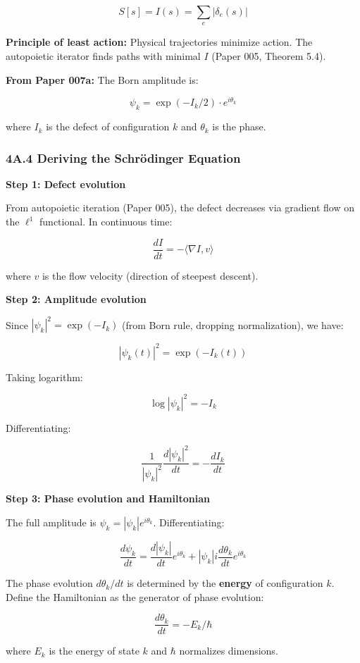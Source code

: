 \documentclass[
]{article}
\begin{document}
\[S[s] = I(s) = \sum_e |\delta_e(s)|\]

\textbf{Principle of least action:} Physical trajectories minimize
action. The autopoietic iterator finds paths with minimal \(I\) (Paper
005, Theorem 5.4).

\textbf{From Paper 007a:} The Born amplitude is:

\[\psi_k = \exp(-I_k/2) \cdot e^{i\theta_k}\]

where \(I_k\) is the defect of configuration \(k\) and \(\theta_k\) is
the phase.

\subsubsection{4A.4 Deriving the Schrödinger
Equation}\label{a.4-deriving-the-schruxf6dinger-equation}

\textbf{Step 1: Defect evolution}

From autopoietic iteration (Paper 005), the defect decreases via
gradient flow on the \(\ell^1\) functional. In continuous time:

\[\frac{dI}{dt} = -\langle \nabla I, v \rangle\]

where \(v\) is the flow velocity (direction of steepest descent).

\textbf{Step 2: Amplitude evolution}

Since \(|\psi_k|^2 = \exp(-I_k)\) (from Born rule, dropping
normalization), we have:

\[|\psi_k(t)|^2 = \exp(-I_k(t))\]

Taking logarithm:

\[\log |\psi_k|^2 = -I_k\]

Differentiating:

\[\frac{1}{|\psi_k|^2} \frac{d|\psi_k|^2}{dt} = -\frac{dI_k}{dt}\]

\textbf{Step 3: Phase evolution and Hamiltonian}

The full amplitude is \(\psi_k = |\psi_k| e^{i\theta_k}\).
Differentiating:

\[\frac{d\psi_k}{dt} = \frac{d|\psi_k|}{dt} e^{i\theta_k} + |\psi_k| i \frac{d\theta_k}{dt} e^{i\theta_k}\]

The phase evolution \(d\theta_k/dt\) is determined by the
\textbf{energy} of configuration \(k\). Define the Hamiltonian as the
generator of phase evolution:

\[\frac{d\theta_k}{dt} = -E_k/\hbar\]

where \(E_k\) is the energy of state \(k\) and \(\hbar\) normalizes
dimensions.
\end{document}
